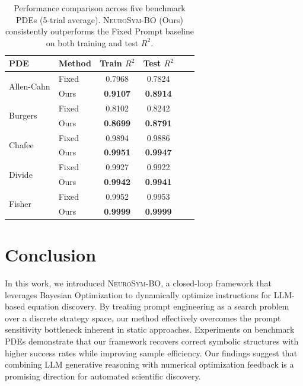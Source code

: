 \documentclass[twoside,11pt]{article}
\newcommand{\ours}{\textsc{NeuroSym-BO}\xspace}
\newcommand{\1}{{\bf 1}}
\newcommand{\0}{{\bf 0}}
\begin{document}
\begin{table}[!htbp]
\centering
\small
\begin{tabular}{llcccc}
\toprule
\textbf{PDE} & \textbf{Method} & \textbf{Train $R^2$} & \textbf{Test $R^2$} \\
\midrule
\multirow{2}{*}{Allen-Cahn} & Fixed & 0.7968 & 0.7824   \\
 & Ours & \textbf{0.9107} & \textbf{0.8914}   \\
 \midrule
\multirow{2}{*}{Burgers} & Fixed & 0.8102 & 0.8242   \\
 & Ours & \textbf{0.8699} & \textbf{0.8791} \\
\midrule
\multirow{2}{*}{Chafee} & Fixed & 0.9894 & 0.9886 \\
 & Ours & \textbf{0.9951} & \textbf{0.9947}  \\
\midrule
\multirow{2}{*}{Divide} & Fixed & 0.9927 & 0.9922  \\
 & Ours & \textbf{0.9942} & \textbf{0.9941} \\
\midrule
\multirow{2}{*}{Fisher} & Fixed & 0.9952 & 0.9953  \\
 & Ours & \textbf{0.9999} & \textbf{0.9999} \\
\bottomrule
\end{tabular}
\caption{\small Performance comparison across five benchmark PDEs (5-trial average). 
\textsc{NeuroSym-BO} (Ours) consistently outperforms the Fixed Prompt baseline 
on both training and test $R^2$.}
\label{tab:results}

\end{table}







\section{Conclusion}

In this work, we introduced \ours, a closed-loop framework that leverages Bayesian Optimization to dynamically optimize instructions for LLM-based equation discovery. By treating prompt engineering as a search problem over a discrete strategy space, our method effectively overcomes the prompt sensitivity bottleneck inherent in static approaches. Experiments on benchmark PDEs demonstrate that our framework recovers correct symbolic structures with higher success rates while improving sample efficiency. Our findings suggest that combining LLM generative reasoning with numerical optimization feedback is a promising direction for automated scientific discovery.
\end{document}
